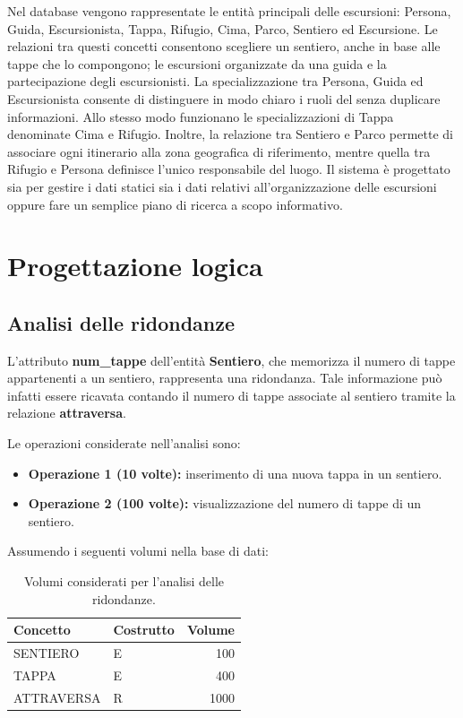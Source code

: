 \documentclass[10pt, a4paper]{article}
\begin{document}
Nel database vengono rappresentate le entità principali delle escursioni: Persona, Guida, Escursionista, Tappa, Rifugio, Cima, Parco, Sentiero ed Escursione. Le relazioni tra questi concetti consentono scegliere un sentiero, anche in base alle tappe che lo compongono; le escursioni organizzate da una guida e la partecipazione degli escursionisti. La specializzazione tra Persona, Guida ed Escursionista consente di distinguere in modo chiaro i ruoli del senza duplicare informazioni. Allo stesso modo funzionano le specializzazioni di Tappa denominate Cima e Rifugio. Inoltre, la relazione tra Sentiero e Parco permette di associare ogni itinerario alla zona geografica di riferimento, mentre quella tra Rifugio e Persona definisce l'unico responsabile del luogo. Il sistema è progettato sia per gestire i dati statici sia i dati relativi all'organizzazione delle escursioni oppure fare un semplice piano di ricerca a scopo informativo.

\section{Progettazione logica}
\subsection{Analisi delle ridondanze}

L'attributo \textbf{num\_tappe} dell'entità \textbf{Sentiero}, che memorizza il numero di tappe appartenenti a un sentiero, rappresenta una ridondanza. Tale informazione può infatti essere ricavata contando il numero di tappe associate al sentiero tramite la relazione \textbf{attraversa}.

Le operazioni considerate nell'analisi sono:

\begin{itemize}
    \item \textbf{Operazione 1 (10 volte):} inserimento di una nuova tappa in un sentiero.
    \item \textbf{Operazione 2 (100 volte):} visualizzazione del numero di tappe di un sentiero.
\end{itemize}

Assumendo i seguenti volumi nella base di dati:

\begin{table}[h]
\centering
\begin{tabular}{l l r}
\toprule
Concetto & Costrutto & Volume \\
\midrule
SENTIERO & E & 100 \\
TAPPA & E & 400 \\
ATTRAVERSA & R & 1000 \\
\bottomrule
\end{tabular}
\caption{Volumi considerati per l'analisi delle ridondanze.}
\end{table}
\end{document}
